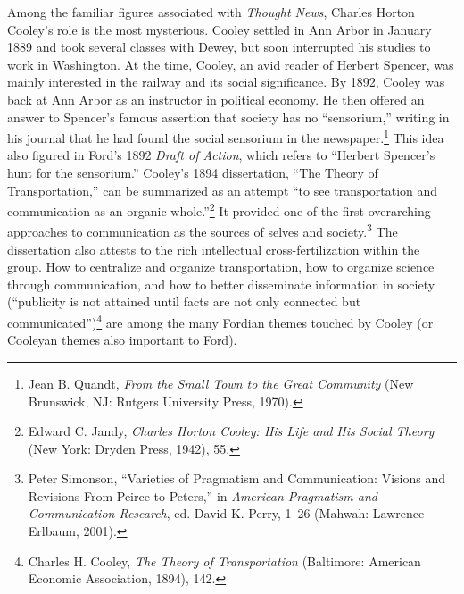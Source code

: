 \documentclass[twoside,symmetric,nobib,justified]{tufte-book}
\begin{document}
Among the familiar figures associated with \emph{Thought News}, Charles
Horton Cooley's role is the most mysterious. Cooley settled in Ann Arbor
in January 1889 and took several classes with Dewey, but soon
interrupted his studies to work in Washington. At the time, Cooley, an
avid reader of Herbert Spencer, was mainly interested in the railway and
its social significance. By 1892, Cooley was back at Ann Arbor as an
instructor in political economy. He then offered an answer to Spencer's
famous assertion that society has no ``sensorium,'' writing in his
journal that he had found the social sensorium in the
newspaper.\footnote{Jean B. Quandt, \emph{From the Small Town to the
  Great Community} (New Brunswick, NJ: Rutgers University Press, 1970).}
This idea also figured in Ford's 1892 \emph{Draft of Action}, which
refers to ``Herbert Spencer's hunt for the sensorium.'' Cooley's 1894
dissertation, ``The Theory of Transportation,'' can be summarized as an
attempt ``to see transportation and communication as an organic
whole.''\footnote{Edward C. Jandy, \emph{Charles Horton Cooley: His Life
  and His Social Theory} (New York: Dryden Press, 1942), 55.} It
provided one of the first overarching approaches to communication as the
sources of selves and society.\footnote{Peter Simonson, ``Varieties of
  Pragmatism and Communication: Visions and Revisions From Peirce to
  Peters,'' in \emph{American Pragmatism and Communication Research},
  ed. David K. Perry, 1--26 (Mahwah: Lawrence Erlbaum, 2001).} The
dissertation also attests to the rich intellectual cross-fertilization
within the group. How to centralize and organize transportation, how to
organize science through communication, and how to better disseminate
information in society (``publicity is not attained until facts are not
only connected but communicated'')\footnote{Charles H. Cooley, \emph{The
  Theory of Transportation} (Baltimore: American Economic Association,
  1894), 142.} are among the many Fordian themes touched by Cooley (or
Cooleyan themes also important to Ford).
\end{document}
